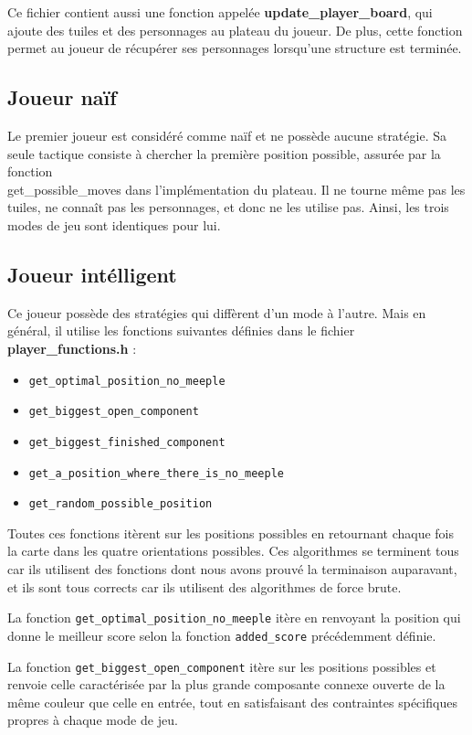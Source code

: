 Ce fichier contient aussi une fonction appelée \textbf{update\_player\_board}, qui ajoute des tuiles et des personnages au plateau du joueur. De plus, cette fonction permet au joueur de récupérer ses personnages lorsqu'une structure est terminée.

\subsection{Joueur naïf}
Le premier joueur est considéré comme naïf et ne possède aucune stratégie. Sa seule tactique consiste à chercher la première position possible, assurée par la fonction \\get\_possible\_moves dans l'implémentation du plateau. Il ne tourne même pas les tuiles, ne connaît pas les personnages, et donc ne les utilise pas. Ainsi, les trois modes de jeu sont identiques pour lui.



\subsection{Joueur intélligent}

Ce joueur possède des stratégies qui diffèrent d'un mode à l'autre. Mais en général, il utilise les fonctions suivantes définies dans le fichier \textbf{player\_functions.h} :

\begin{itemize}
    \item \texttt{get\_optimal\_position\_no\_meeple}
    \item \texttt{get\_biggest\_open\_component}
    \item \texttt{get\_biggest\_finished\_component}
    \item \texttt{get\_a\_position\_where\_there\_is\_no\_meeple}
    \item \texttt{get\_random\_possible\_position}
\end{itemize}
Toutes ces fonctions itèrent sur les positions possibles en retournant chaque fois la carte dans les quatre orientations possibles. Ces algorithmes se terminent tous car ils utilisent des fonctions dont nous avons prouvé la terminaison auparavant, et ils sont tous corrects car ils utilisent des algorithmes de force brute.

La fonction \texttt{get\_optimal\_position\_no\_meeple} itère en renvoyant la position qui donne le meilleur score selon la fonction \texttt{added\_score} précédemment définie.

La fonction \texttt{get\_biggest\_open\_component} itère sur les positions possibles et renvoie celle caractérisée par la plus grande composante connexe ouverte de la même couleur que celle en entrée, tout en satisfaisant des contraintes spécifiques propres à chaque mode de jeu.

